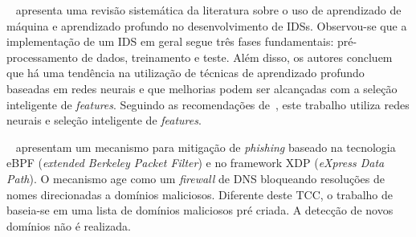 ~\citet{https://doi.org/10.1002/ett.4150} apresenta uma revisão sistemática da literatura sobre o uso de aprendizado de máquina e aprendizado profundo no desenvolvimento de IDSs. %
Observou-se que a implementação de um IDS em geral segue três fases fundamentais: pré-processamento de dados, treinamento e teste. Além disso, os autores concluem que há uma tendência na utilização de técnicas de aprendizado profundo baseadas em redes neurais %
e que melhorias podem ser alcançadas com %
a seleção inteligente de \textit{features}. %
Seguindo as recomendações de~\citet{https://doi.org/10.1002/ett.4150}, este trabalho utiliza redes neurais e seleção inteligente de \textit{features}.

~\citet{sbseg-phishing} apresentam um mecanismo para mitigação de \textit{phishing} baseado na tecnologia eBPF (\textit{extended Berkeley Packet Filter}) e no framework XDP (\textit{eXpress Data Path}). O mecanismo age como um \textit{firewall} de DNS bloqueando resoluções de nomes direcionadas a domínios maliciosos. %
Diferente deste TCC, o trabalho de ~\citet{sbseg-phishing} baseia-se em uma lista de domínios maliciosos pré criada. A detecção de novos domínios não é realizada.